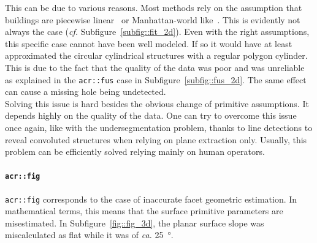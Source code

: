                 This can be due to various reasons.
                Most methods rely on the assumption that buildings are piecewise linear~\parencite{nan2017polyfit} or Manhattan-world like~\parencite{li2016manhattan}.
                This is evidently not always the case (\textit{cf.} Subfigure~\ref{subfig::fit_2d}).
                Even with the right assumptions, this specific case cannot have been well modeled.
                If so it would have at least approximated the circular cylindrical structures with a regular polygon cylinder.
                This is due to the fact that the quality of the data was poor and was unreliable as explained in the \texttt{\gls{acr::fus}} case in Subfigure~\ref{subfig::fus_2d}.
                The same effect can cause a missing hole being undetected.\\

                Solving this issue is hard besides the obvious change of primitive assumptions.
                It depends highly on the quality of the data.
                One can try to overcome this issue once again, like with the undersegmentation problem, thanks to line detections to reveal convoluted structures when relying on plane extraction only.
                Usually, this problem can be efficiently solved relying mainly on human operators.

            \paragraph{\texttt{\acrlong*{acr::fig}}}
                \texttt{\gls{acr::fig}} corresponds to the case of inaccurate facet geometric estimation.
                In mathematical terms, this means that the surface primitive parameters are misestimated.
                In Subfigure~\ref{fig::fig_3d}, the planar surface slope was miscalculated as flat while it was of \textit{ca.} \SI{25}{\degree}.\\

